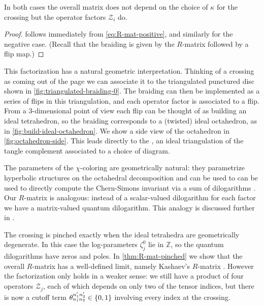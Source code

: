 \documentclass{sl2ams}
\numberwithin{equation}{section}
\newcommand{\ZZ}{\mathbb{Z}}
\begin{document}
  In both cases the overall matrix does not depend on the choice of \(\kappa\) for the crossing but the operator factors \(\mathcal{Z}_i\) do.

\begin{proof}
   follows immediately from \cref{eq:R-mat-positive}, and similarly for the negative case.
  (Recall that the braiding is given by the \(R\)-matrix followed by a flip map.)
\end{proof}

\begin{marginfigure}
  
  \caption{
    A side view of the ideal octahedron in \cref{fig:triangulated-braiding-total}.
    The grey dashed edges indicate the identification of the ideal vertices \(P_{+}, P_{+}'\) and \(P_{-}, P_{-}'\).
  }
  \label{fig:octahedron-side}
\end{marginfigure}

This factorization has a natural geometric interpretation.
Thinking of a crossing as coming out of the page we can associate it to the triangulated punctured disc shown in \cref{fig:triangulated-braiding-0}.
The braiding can then be implemented as a series of flips in this triangulation, and each operator factor is associated to a flip.
From a \(3\)-dimensional point of view each flip can be thought of as building an ideal tetrahedron, so the braiding corresponds to a (twisted) ideal octahedron, as in \cref{fig:build-ideal-octahedron}.
We show a side view of the octahedron in \cref{fig:octahedron-side}.
This leads directly to the  \cite{Kim2018}, an ideal triangulation of the tangle complement associated to a choice of diagram.

The parameters of the \(\chi\)-coloring are geometrically natural: they parametrize hyperbolic structures on the octahedral decomposition \cite{McPhailSnyder2022,McPhailSnyder2024} and can be used to can be used to directly compute the Chern-Simons invariant via a sum of dilogarithms \cite{Cho2014,McPhailSnyderVolume}.
Our \(R\)-matrix is analogous: instead of a scalar-valued dilogarithm for each factor we have a matrix-valued quantum dilogarithm.
This analogy is discussed further in \cite{McPhailSnyderVolume}.

The crossing is pinched exactly when the ideal tetrahedra are geometrically degenerate.
In this case the log-parameters \(\zeta_j^0\) lie in \(\ZZ\), so the quantum dilogarithms have zeros and poles.
In \cref{thm:R-mat-pinched} we show that the overall \(R\)-matrix has a well-defined limit, namely Kashaev's \(R\)-matrix \cite{Kashaev1995}.
However the factorization only holds in a weaker sense: we still have a product of four operators \(\mathcal{Z}_j\), each of which depends on only two of the tensor indices, but there is now a cutoff term \(\theta_{n_1 n_2}^{n_1' n_2'} \in \set{0, 1}\) involving every index at the crossing.
\end{document}
